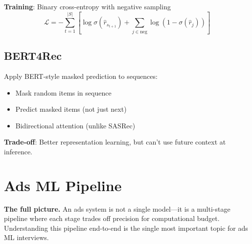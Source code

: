 \textbf{Training}: Binary cross-entropy with negative sampling
\begin{equation}
\mathcal{L} = -\sum_{t=1}^{|S|} [\log \sigma(\hat{r}_{s_{t+1}}) + \sum_{j \in \text{neg}} \log(1 - \sigma(\hat{r}_j))]
\end{equation}

\subsection{BERT4Rec}

Apply BERT-style masked prediction to sequences:
\begin{itemize}
    \item Mask random items in sequence
    \item Predict masked items (not just next)
    \item Bidirectional attention (unlike SASRec)
\end{itemize}

\textbf{Trade-off}: Better representation learning, but can't use future context at inference.

\section{Ads ML Pipeline}
\label{sec:ads_pipeline}

\textbf{The full picture.} An ads system is not a single model---it is a multi-stage pipeline where each stage trades off precision for computational budget. Understanding this pipeline end-to-end is the single most important topic for ads ML interviews.

